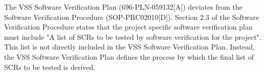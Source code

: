 The VSS Software Verification Plan (696-PLN-059132[A]) deviates from the
Software Verification Procedure (SOP-PRC02010[D]). Section 2.3 of the Software
Verification Procedure states that the project specific software verification
plan must include "A list of SCRs to be tested by software verification for the
project". This list is not directly included in the VSS Software Verification
Plan. Instead, the VSS Software Verification Plan defines the process by which
the final list of SCRs to be tested is derived.
